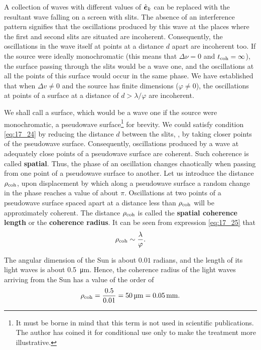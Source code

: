 A collection of waves with different values of $\hat{\boldsymbol{e}}_{k}$ can be replaced with the resultant wave falling on a screen with slits.
The absence of an interference pattern signifies that the oscillations produced by this wave at the places where the first and second slits are situated are incoherent.
Consequently, the oscillations in the wave itself at points at a distance $d$ apart are incoherent too.
If the source were ideally monochromatic (this means that $\Delta{\nu}=0$ and $t_{\text{coh}}=\infty$), the surface passing through the slits would be a wave one, and the oscillations at all the points of this surface would occur in the same phase.
We have established that when $\Delta{v}\neq 0$ and the source has finite dimensions ($\varphi\neq 0$), the oscillations at points of a surface at a distance of $d>\lambda/\varphi$ are incoherent.

We shall call a surface, which would be a wave one if the source were monochromatic, a pseudowave surface\footnote{It must be borne in mind that this term is not used in scientific publications. The author has coined it for conditional use only to make the treatment
more illustrative.} for brevity.
We could satisfy condition \eqref{eq:17_24} by reducing the distance $d$ between the slits, \ie, by taking closer points of the pseudowave surface.
Consequently, oscillations produced by a wave at adequately close points of a pseudowave surface are coherent.
Such coherence is called \textbf{spatial}.
Thus, the phase of an oscillation changes chaotically when passing from one point of a pseudowave surface to another.
Let us introduce the distance $\rho_{\text{coh}}$, upon displacement by which along a pseudowave
surface a random change in the phase reaches a value of about $\pi$.
Oscillations at two points of a pseudowave surface spaced apart at a distance less than $\rho_{\text{coh}}$ will be approximately coherent.
The distance $\rho_{\text{coh}}$ is called the \textbf{spatial coherence length} or the \textbf{coherence radius}.
It can be seen from expression \eqref{eq:17_25} that
\begin{equation}\label{eq:17_26}
    \rho_{\text{coh}} \sim \frac{\lambda}{\varphi}.
\end{equation}

The angular dimension of the Sun is about $0.01$ radians, and the length of its light waves is about \SI{0.5}{\micro\metre}.
Hence, the coherence radius of the light waves arriving from the Sun has a value of the order of
\begin{equation}\label{eq:17_27}
    \rho_{\text{coh}} = \frac{0.5}{0.01} = \SI{50}{\micro\metre} = \SI{0.05}{\milli\metre}.
\end{equation}

